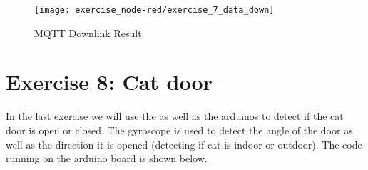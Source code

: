 \begin{figure}[H]
  \centering
  \texttt{[image: exercise\_node-red/exercise\_7\_data\_down]}
  \caption{MQTT Downlink Result}
  \label{fig:exercise_7_data_down}
\end{figure}


\section{Exercise 8: Cat door}

In the last exercise we will use the  as well as the arduinos  to 
detect if the cat door is open or closed. The gyroscope is used to detect the angle of the door 
as well as the direction it is opened (detecting if cat is indoor or outdoor).
\newline
\newline
The code running on the arduino board is shown below.

